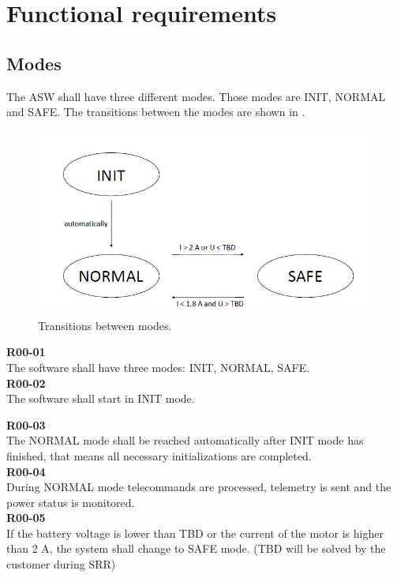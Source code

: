 \section{Functional requirements}

\subsection{Modes}

The ASW shall have three different modes. Those modes are INIT, NORMAL and SAFE. The transitions between the modes are shown in .\\


\begin{figure}
\centering
\includegraphics[scale=0.8]{modes.PNG}
\caption{Transitions between modes.}
\label{fig:modes}
\end{figure}

\textbf{R00-01}\\
The software shall have three modes: INIT, NORMAL, SAFE.\\

\textbf{R00-02}\\
The software shall start in INIT mode.\\

\newpage

\textbf{R00-03}\\
The NORMAL mode shall be reached automatically after INIT mode has finished, that means all necessary initializations are completed.\\

\textbf{R00-04}\\
During NORMAL mode telecommands are processed, telemetry is sent and the power status is monitored.\\

\textbf{R00-05}\\
If the battery voltage is lower than TBD or the current of the motor is higher than 2 A, the system shall change to SAFE mode. (TBD will be solved by the customer during SRR)\\

